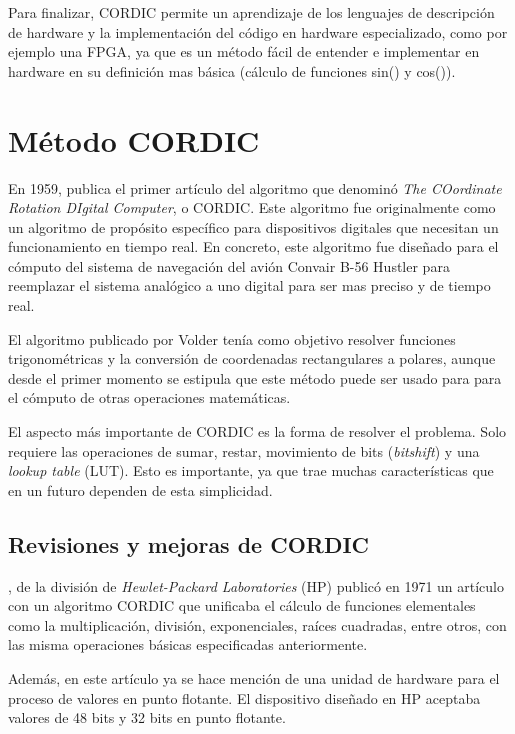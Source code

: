Para finalizar, CORDIC permite un aprendizaje de los lenguajes de descripción de hardware y la implementación del código en hardware especializado, como por ejemplo una FPGA, ya que es un método fácil de entender e implementar en hardware en su definición mas básica (cálculo de funciones sin() y cos()).

\section{Método CORDIC}

En 1959, \citeauthor{volder_cordic_1959} publica el primer artículo del algoritmo que denominó \textit{The COordinate Rotation DIgital Computer}, o CORDIC. Este algoritmo fue originalmente como un algoritmo de propósito específico para dispositivos digitales que necesitan un funcionamiento en tiempo real. En concreto, este algoritmo fue diseñado para el cómputo del sistema de navegación del avión Convair B-56 Hustler para reemplazar el sistema analógico a uno digital para ser mas preciso y de tiempo real. 

El algoritmo publicado por Volder tenía como objetivo resolver funciones trigonométricas y la conversión de coordenadas rectangulares a polares, aunque desde el primer momento se estipula que este método puede ser usado para para el cómputo de otras operaciones matemáticas.

El aspecto más importante de CORDIC es la forma de resolver el problema. Solo requiere las operaciones de sumar, restar, movimiento de bits (\textit{bitshift}) y una \textit{lookup table} (LUT). Esto es importante, ya que trae muchas características que en un futuro dependen de esta simplicidad.


\subsection{Revisiones y mejoras de CORDIC}

\cite{walther_unified_1971}, de la división de \textit{Hewlet-Packard Laboratories} (HP) publicó en 1971 un artículo con un algoritmo CORDIC que unificaba el cálculo de funciones elementales como la multiplicación, división, exponenciales, raíces cuadradas, entre otros, con las misma operaciones básicas especificadas anteriormente.

Además, en este artículo ya se hace mención de una unidad de hardware para el proceso de valores en punto flotante. El dispositivo diseñado en HP aceptaba valores de 48 bits y 32 bits en punto flotante.


